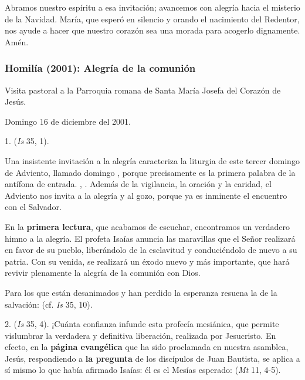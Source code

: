 Abramos nuestro espíritu a esa invitación; avancemos con alegría hacia el misterio de la Navidad. María, que esperó en silencio y orando el nacimiento del Redentor, nos ayude a hacer que nuestro corazón sea una morada para acogerlo dignamente. Amén.



\subsubsection{Homilía (2001): Alegría de la comunión}

Visita pastoral a la Parroquia romana de Santa María Josefa del Corazón de Jesús.

Domingo 16 de diciembre del 2001.

1.  (\emph{Is} 35, 1).

Una insistente invitación a la alegría caracteriza la liturgia de este tercer domingo de Adviento, llamado domingo , porque precisamente  es la primera palabra de la antífona de entrada. , . Además de la vigilancia, la oración y la caridad, el Adviento nos invita a la alegría y al gozo, porque ya es inminente el encuentro con el Salvador.

En la \textbf{primera lectura}, que acabamos de escuchar, encontramos un verdadero himno a la alegría. El profeta Isaías anuncia las maravillas que el Señor realizará en favor de su pueblo, liberándolo de la esclavitud y conduciéndolo de nuevo a su patria. Con su venida, se realizará un éxodo nuevo y más importante, que hará revivir plenamente la alegría de la comunión con Dios.

Para los que están desanimados y han perdido la esperanza resuena la  de la salvación:  (cf. \emph{Is} 35, 10).

2.  (\emph{Is} 35, 4). ¡Cuánta confianza infunde esta profecía mesiánica, que permite vislumbrar la verdadera y definitiva liberación, realizada por Jesucristo. En efecto, en la \textbf{página evangélica} que ha sido proclamada en nuestra asamblea, Jesús, respondiendo a \textbf{la pregunta} de los discípulos de Juan Bautista, se aplica a sí mismo lo que había afirmado Isaías: él es el Mesías esperado:  (\emph{Mt} 11, 4-5).

